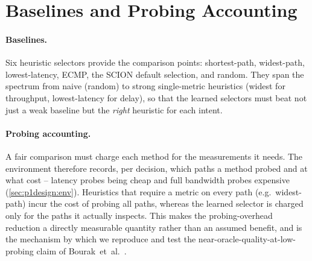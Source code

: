 \section{Baselines and Probing Accounting}
\label{sec:p1impl:baselines}

\paragraph{Baselines.} Six heuristic selectors provide the comparison points: shortest-path,
widest-path, lowest-latency, ECMP, the SCION default selection, and random. They span the spectrum from
naive (random) to strong single-metric heuristics (widest for throughput, lowest-latency for delay), so
that the learned selectors must beat not just a weak baseline but the \emph{right} heuristic for each
intent.

\paragraph{Probing accounting.} A fair comparison must charge each method for the measurements it needs.
The environment therefore records, per decision, which paths a method probed and at what cost -- latency
probes being cheap and full bandwidth probes expensive (\cref{sec:p1design:env}). Heuristics that require
a metric on every path (e.g.\ widest-path) incur the cost of probing all paths, whereas the learned
selector is charged only for the paths it actually inspects. This makes the probing-overhead reduction a
directly measurable quantity rather than an assumed benefit, and is the mechanism by which we reproduce
and test the near-oracle-quality-at-low-probing claim of Bourak~et~al.~\cite{Bourak2025}.
